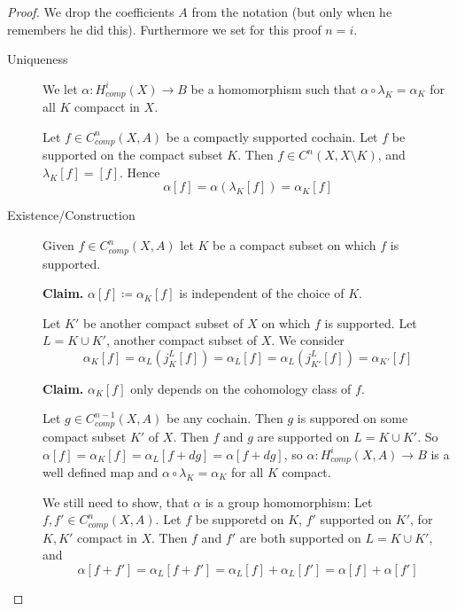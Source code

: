 \documentclass[language=english]{TemplateLecture}
\begin{document}
\begin{proof}
    We drop the coefficients \(A\) from the notation (but only when he remembers he did this). Furthermore we set for this proof \(n = i\).
    \begin{description}
        \item[Uniqueness] We let \(\alpha\colon H^i_{comp}(X) \to B\) be a homomorphism such that \(\alpha\circ \lambda_K = \alpha_K\) for all \(K\) compacct in \(X\).
        
        Let \(f \in C_{comp}^n(X,A)\) be a compactly supported cochain. Let \(f\) be supported on the compact subset \(K\). Then \(f \in C^n(X, X\setminus K)\), and \(\lambda_K[f] = [f]\). Hence
        \[\alpha[f] = \alpha(\lambda_K[f]) = \alpha_K[f]\]

        \item[Existence/Construction] Given \(f \in C^n_{comp}(X,A)\) let \(K\) be a compact subset on which \(f\) is supported.
        
        \textbf{Claim.} \(\alpha[f] \coloneq \alpha_K[f]\) is independent of the choice of \(K\).

        Let \(K'\) be another compact subset of \(X\) on which \(f\) is supported. Let \(L = K \cup K'\), another compact subset of \(X\). We consider
        \[\alpha_K[f] = \alpha_L(j_K^L[f]) = \alpha_L[f] = \alpha_L(j_{K'}^L[f]) = \alpha_{K'}[f]\]

        \textbf{Claim.} \(\alpha_K[f]\) only depends on the cohomology class of \(f\).

        Let \(g \in C_{comp}^{n-1}(X,A)\) be any cochain. Then \(g\) is suppored on some compact subset \(K'\) of \(X\). Then \(f\) and \(g\) are supported on \(L = K \cup K'\). So \(\alpha[f] = \alpha_K[f] = \alpha_L[f + dg] = \alpha[f+dg]\), so \(\alpha\colon H_{comp}^i(X,A) \to B\) is a well defined map and \(\alpha\circ \lambda_K = \alpha_K\) for all \(K\) compact.

        We still need to show, that \(\alpha\) is a group homomorphism: Let \(f, f' \in C_{comp}^n(X,A)\). Let \(f \) be supporetd on \(K\), \(f'\) supported on \(K'\), for \(K, K'\) compact in \(X\). Then \(f\) and \(f'\) are both supported on \(L = K \cup K'\), and
        \[\alpha[f + f'] = \alpha_L[f+f'] = \alpha_L[f] + \alpha_L[f'] = \alpha[f] + \alpha[f']\]
    \end{description}
\end{proof}
\end{document}
